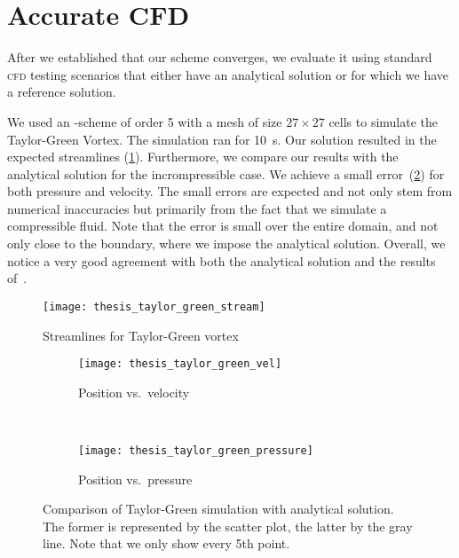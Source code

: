 \section{Accurate CFD}
After we established that our scheme converges, we evaluate it using standard \textsc{cfd} testing scenarios that either have an analytical solution or for which we have a reference solution.

We used an \aderdg{}-scheme of order 5 with a mesh of size $27 \times 27$ cells to simulate the Taylor-Green Vortex.
The simulation ran for \SI{10}{\s}.
Our solution resulted in the expected streamlines (\cref{fig:taylor-green-streamlines}).
Furthermore, we compare our results with the analytical solution for the incrompressible case.
We achieve a small error~(\cref{fig:taylor-green-result}) for both pressure and velocity.
The small errors are expected and not only stem from numerical inaccuracies but primarily from the fact that we simulate a compressible fluid.
Note that the error is small over the entire domain, and not only close to the boundary, where we impose the analytical solution.
Overall, we notice a very good agreement with both the analytical solution and the results of~\cite{dumbser2016high}.

\begin{figure}[htb]
  \centering
  \texttt{[image: thesis\_taylor\_green\_stream]}
  \caption{Streamlines for Taylor-Green vortex}
  \label{fig:taylor-green-streamlines}
\end{figure}

\begin{figure}[htb]
  \centering
  \begin{subfigure}[t]{0.5\textwidth}
    \centering
    \texttt{[image: thesis\_taylor\_green\_vel]}
    \caption{Position vs.\ velocity}
  \end{subfigure}~%
  \begin{subfigure}[t]{0.5\textwidth}
    \centering
    \texttt{[image: thesis\_taylor\_green\_pressure]}
    \caption{Position vs.\ pressure}
  \end{subfigure}
  \caption{\label{fig:taylor-green-result}%
    Comparison of Taylor-Green simulation with analytical solution.
    The former is represented by the scatter plot, the latter by the gray line.
    Note that we only show every 5th point.}
\end{figure}


